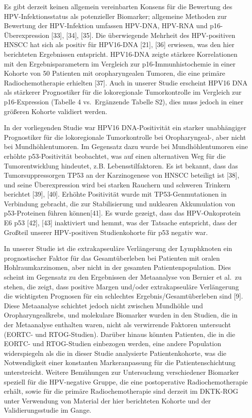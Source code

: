 Es gibt derzeit keinen allgemein vereinbarten Konsens für die Bewertung des HPV-Infektionsstatus als potenzieller Biomarker; allgemeine Methoden zur Bewertung der HPV-Infektion umfassen HPV-DNA, HPV-RNA und p16-Überexpression {[}33{]}, {[}34{]}, {[}35{]}. Die überwiegende Mehrheit des HPV-positiven HNSCC hat sich als positiv für HPV16-DNA {[}21{]}, {[}36{]} erwiesen, was den hier berichteten Ergebnissen entspricht. HPV16-DNA zeigte stärkere Korrelationen mit den Ergebnisparametern im Vergleich zur p16-Immunhistochemie in einer Kohorte von 50 Patienten mit oropharyngealen Tumoren, die eine primäre Radiochemotherapie erhielten {[}37{]}. Auch in unserer Studie erscheint HPV16 DNA als stärkerer Prognostiker für die lokoregionale Tumorkontrolle im Vergleich zur p16-Expression (Tabelle 4 vs.~Ergänzende Tabelle S2), dies muss jedoch in einer größeren Kohorte validiert werden.

In der vorliegenden Studie war HPV16 DNA-Positivität ein starker unabhängiger Prognostiker für die lokoregionale Tumorkontrolle bei Oropharyngeal-, aber nicht bei Mundhöhlentumoren. Im Gegensatz dazu wurde bei Mundhöhlentumoren eine erhöhte p53-Positivität beobachtet, was auf einen alternativen Weg für die Tumorentwicklung hindeutet, z.B. Lebensstilfaktoren. Es ist bekannt, dass das Tumorsuppressorgen TP53 an der Karzinogenese von HNSCC beteiligt ist {[}38{]}, und seine Überexpression wird bei starken Rauchern und schweren Trinkern berichtet {[}39{]}, {[}40{]}. Erhöhte Positivität wurde mit TP53-Genmutationen in Verbindung gebracht, die zur Stabilisierung und nuklearen Akkumulation von p53-Proteinen führen können{[}41{]}. Es wurde gezeigt, dass das HPV-Onkoprotein E6 p53 {[}42{]}, {[}43{]} inaktiviert und hemmt, was der Tatsache entspricht, dass der Großteil unserer HPV-positiven Studienkohorte für p53 negativ war.

In unserer Studie ist die extrakapseuläre Verlängerung der Lymphknoten ein prognostischer Faktor für das Gesamtüberleben bei Patienten mit oralen Hohlraumkarzinomen, aber nicht in der gesamten Patientenpopulation. Dies scheint im Gegensatz zu den Ergebnissen der Metaanalyse von Bernier et al.~zu stehen, die zeigt, dass positive Margen und/oder extrakapseuläre Verlängerung die wichtigsten Prognosen für ein schlechtes Ergebnis/Gesamtüberleben sind {[}9{]}. Diese Metaanalyse schichtet jedoch nicht zwischen Mundhöhle und Oropharyngealkrebs, und molekulare Biomarker wurden in den Studien, die in der Metaanalyse enthalten waren, nicht als verwirrende Faktoren untersucht (EORTC- und RTOG-Studien). Darüber hinaus könnten Patienten, die in die EORTC- und RTOG-Studien einbezogen werden, eine andere Population widerspiegeln als die in dieser Studie analysierte Patientenkohorte, was die Notwendigkeit einer konstanten Markeranpassung für die Patientenschichtung unterstreicht. Weitere Bemühungen zur Untersuchung verschiedener Biomarker speziell für die HPV-negative Gruppe, die eine postoperative Radiochemotherapie erhält, sowie für die primäre Radiochemotherapie sind derzeit im DKTK-ROG unter Verwendung von Material der hier berichteten Kohorte und der Validierungsstudie im Gange.

